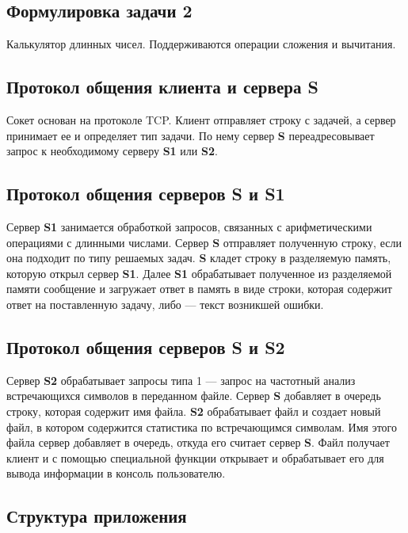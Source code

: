 \documentclass[a4paper,14pt]{extarticle}
\begin{document}
\subsection{Формулировка задачи 2}
Калькулятор длинных чисел. Поддерживаются операции сложения и вычитания.

\subsection{Протокол общения клиента и сервера \textbf{S}}
Сокет основан на протоколе TCP. Клиент отправляет строку с задачей, а сервер принимает ее и определяет тип задачи. По нему сервер \textbf{S} переадресовывает запрос к необходимому серверу \textbf{S1} или \textbf{S2}.

\subsection{Протокол общения серверов \textbf{S} и \textbf{S1}}
Сервер \textbf{S1} занимается обработкой запросов, связанных с арифметическими операциями с длинными числами. Сервер \textbf{S} отправляет полученную строку, если она подходит по типу решаемых задач. \textbf{S} кладет строку в разделяемую память, которую открыл сервер \textbf{S1}. Далее \textbf{S1} обрабатывает полученное из разделяемой памяти сообщение и загружает ответ в память в виде строки, которая содержит ответ на поставленную задачу, либо --- текст возникшей ошибки.

\subsection{Протокол общения серверов \textbf{S} и \textbf{S2}}
Сервер \textbf{S2} обрабатывает запросы типа 1 --- запрос на частотный анализ встречающихся символов в переданном файле. Сервер \textbf{S} добавляет в очередь строку, которая содержит имя файла. \textbf{S2} обрабатывает файл и создает новый файл, в котором содержится статистика по встречающимся символам. Имя этого файла сервер добавляет в очередь, откуда его считает сервер \textbf{S}. Файл получает клиент и с помощью специальной функции открывает и обрабатывает его для вывода информации в консоль пользователю.

\subsection{Структура приложения}
\end{document}
